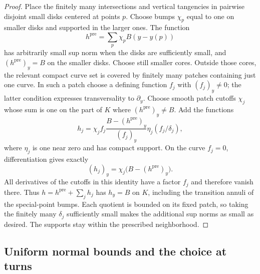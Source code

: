 \begin{proof}
Place the finitely many intersections and vertical tangencies in
pairwise disjoint small disks centered at points $p$.  Choose bumps
$\chi_p$ equal to one on smaller disks and supported in the larger ones.
The function
\[
 h^{\mathrm{pre}}=\sum_p\chi_p B(y-y(p))
\]
has arbitrarily small sup norm when the disks are sufficiently small,
and $(h^{\mathrm{pre}})_y=B$ on the smaller disks.
Choose still smaller cores.  Outside those cores, the relevant compact
curve set is covered by finitely many patches containing just one
curve.  In such a patch choose a defining function $f_j$ with
$(f_j)_y\ne0$; the latter condition expresses transversality to
$\partial_y$.  Choose smooth patch cutoffs $\chi_j$ whose sum is one
on the part of $K$ where $(h^{\mathrm{pre}})_y\ne B$.
Add the functions
\[
 h_j=\chi_j f_j
       \frac{B-(h^{\mathrm{pre}})_y}{(f_j)_y}
       \eta_j(f_j/\delta_j),
\]
where $\eta_j$ is one near zero and has compact support.
On the curve $f_j=0$, differentiation gives exactly
\[
 (h_j)_y=\chi_j\bigl(B-(h^{\mathrm{pre}})_y\bigr).
\]
All derivatives of the cutoffs in this identity have a factor $f_j$
and therefore vanish there.  Thus
$h=h^{\mathrm{pre}}+\sum_jh_j$ has $h_y=B$ on $K$, including the
transition annuli of the special-point bumps.  Each quotient is bounded
on its fixed patch, so taking the finitely many $\delta_j$ sufficiently
small makes the additional sup norms as small as desired.  The supports
stay within the prescribed neighborhood.
\end{proof}

\subsection{Uniform normal bounds and the choice at turns}

